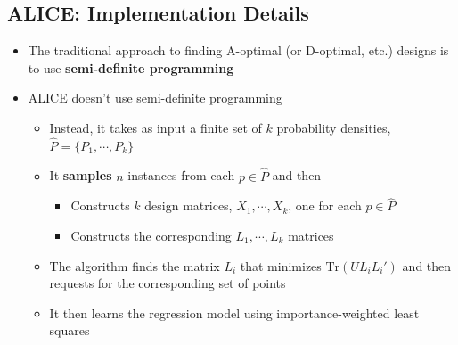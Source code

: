 \documentclass[10pt]{article}
\begin{document}
\subsection*{ALICE: Implementation Details}
\begin{itemize}
	\item The traditional approach to finding A-optimal (or D-optimal, etc.) designs is to use \textbf{semi-definite programming}
	\item ALICE doesn't use semi-definite programming
	\begin{itemize}
	    \item Instead, it takes as input a finite set of $k$ probability densities, $\hat{P} = \{P_1, \cdots, P_k\}$
	    \item It \textbf{samples} $n$ instances from each $p \in \hat{P}$ and then
	    \begin{itemize}
	        \item Constructs $k$ design matrices, $X_1, \cdots, X_k$, one for each $p \in \hat{P}$
	        \item Constructs the corresponding $L_1, \cdots, L_k$ matrices
        \end{itemize}
        \item The algorithm finds the matrix $L_i$ that minimizes $\text{Tr}(UL_i L_i')$ and then requests for the corresponding set of points
        \item It then learns the regression model using importance-weighted least squares
    \end{itemize}
\end{itemize}
\end{document}
